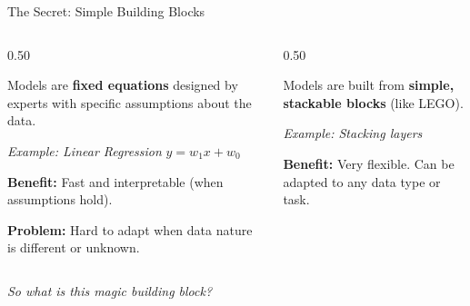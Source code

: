 \begin{frame}{The Secret: Simple Building Blocks}
    \vspace{2.5em}
    \begin{columns}[c]
        \begin{column}{0.50\textwidth}
            \begin{tcolorbox}[colback=red!5, colframe=red!50, title=\textbf{Traditional ML}]
                \small
                Models are \textbf{fixed equations} designed by experts with specific assumptions about the data.
                \vspace{0.5em}
                
                \textit{Example: Linear Regression}
                $ y = w_1 x + w_0 $
                
                \vspace{0.5em}
                \textbf{Benefit:} Fast and interpretable (when assumptions hold).
                
                \vspace{0.3em}
                \textbf{Problem:} Hard to adapt when data nature is different or unknown.
            \end{tcolorbox}
        \end{column}
        
        \begin{column}{0.50\textwidth}
            \begin{tcolorbox}[colback=blue!5, colframe=blue!50, title=\textbf{Deep Learning}]
                \small
                Models are built from \textbf{simple, stackable blocks} (like LEGO).
                \vspace{0.5em}
                
                \textit{Example: Stacking layers}
                \vspace{0.5em}
                \centering
                
                \vspace{0.5em}
                \raggedright
                \textbf{Benefit:} Very flexible. Can be adapted to any data type or task.
            \end{tcolorbox}
        \end{column}
    \end{columns}

    \pause
    \vspace{1.5em}
    \centering
    \textit{So what is this magic building block?}
\end{frame}

